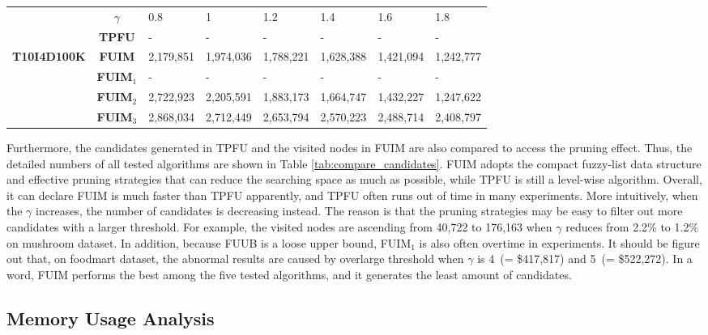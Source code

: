 \documentclass[journal]{IEEEtran}
\begin{document}
\begin{table*}[htbp]
\begin{tabular}{|c|c|llllll|}
		& $\gamma$	   & 0.8\textperthousand & 1\textperthousand & 1.2\textperthousand & 1.4\textperthousand & 1.6\textperthousand & 1.8\textperthousand \\ \cline{2-8}
		&\textbf{TPFU} 		   & - & - & - & - & - & - \\
		\textbf{T10I4D100K} &\textbf{FUIM}  		  & 2,179,851 & 1,974,036 & 1,788,221 & 1,628,388 & 1,421,094 & 1,242,777 \\
		&\textbf{FUIM$_{1}$}  & - & - & - & - & - & -  \\
		&\textbf{FUIM$_{2}$}  & 2,722,923 & 2,205,591 & 1,883,173 & 1,664,747 & 1,432,227 & 1,247,622  \\
		&\textbf{FUIM$_{3}$}  & 2,868,034 & 2,712,449 & 2,653,794 & 2,570,223 & 2,488,714 & 2,408,797 \\ \hline
		
		\hline\hline
	\end{tabular}
\end{table*}




Furthermore, the candidates generated in TPFU and the visited nodes in FUIM are also compared to access the pruning effect. Thus, the detailed numbers of all tested algorithms are shown in Table \ref{tab:compare_candidates}. FUIM adopts the compact fuzzy-list data structure and effective pruning strategies that can reduce the searching space as much as possible, while TPFU is still a level-wise algorithm. Overall, it can declare FUIM is much faster than TPFU apparently, and TPFU often runs out of time in many experiments. More intuitively, when the $\gamma$ increases, the number of candidates is decreasing instead. The reason is that the pruning strategies may be easy to filter out more candidates with a larger threshold. For example, the visited nodes are ascending from 40,722 to 176,163 when $\gamma$ reduces from 2.2\% to 1.2\% on mushroom dataset. In addition, because FUUB is a loose upper bound, FUIM$_1$ is also often overtime in experiments. It should be figure out that, on foodmart dataset, the abnormal results are caused by overlarge threshold when $\gamma$ is 4\textperthousand $\,$  (= \$417,817) and 5\textperthousand $\,$  (= \$522,272). In a word, FUIM performs the best among the five tested algorithms, and it generates the least amount of candidates.


\subsection{Memory Usage Analysis}
\end{document}
